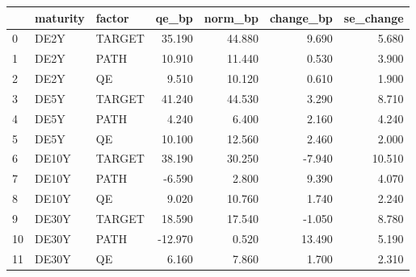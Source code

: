 \begin{tabular}{lllrrrr}
\toprule
 & maturity & factor & qe\_bp & norm\_bp & change\_bp & se\_change \\
\midrule
0 & DE2Y & TARGET & 35.190 & 44.880 & 9.690 & 5.680 \\
1 & DE2Y & PATH & 10.910 & 11.440 & 0.530 & 3.900 \\
2 & DE2Y & QE & 9.510 & 10.120 & 0.610 & 1.900 \\
3 & DE5Y & TARGET & 41.240 & 44.530 & 3.290 & 8.710 \\
4 & DE5Y & PATH & 4.240 & 6.400 & 2.160 & 4.240 \\
5 & DE5Y & QE & 10.100 & 12.560 & 2.460 & 2.000 \\
6 & DE10Y & TARGET & 38.190 & 30.250 & -7.940 & 10.510 \\
7 & DE10Y & PATH & -6.590 & 2.800 & 9.390 & 4.070 \\
8 & DE10Y & QE & 9.020 & 10.760 & 1.740 & 2.240 \\
9 & DE30Y & TARGET & 18.590 & 17.540 & -1.050 & 8.780 \\
10 & DE30Y & PATH & -12.970 & 0.520 & 13.490 & 5.190 \\
11 & DE30Y & QE & 6.160 & 7.860 & 1.700 & 2.310 \\
\bottomrule
\end{tabular}
